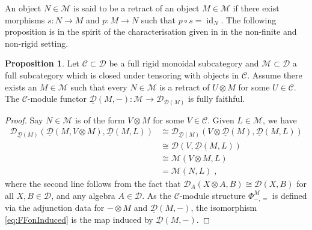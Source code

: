 \documentclass[12pt,dvipsnames]{article}
\numberwithin{equation}{section}
\theoremstyle{definition}
\newtheorem{proposition}[definition]{Proposition}
\newcommand{\cat}[1]{\mathcal{#1}}
\newcommand{\1}{\ensuremath{\mathbbm{1}}}
\DeclareMathOperator{\Id}{id}
\newcommand{\blank}{{-}}
\newcommand{\bblank}{{=}}
\begin{document}
An object $N\in\cat{M}$ is said to be a retract of an object $M\in\cat{M}$ if there exist morphisms $s:N\to M$ and $p:M\to N$ such that $p\circ s = \Id_N$. The following proposition is in the spirit of the characterisation given in \cite[Thm.\,7.10.1]{EGNO15} in the non-finite and non-rigid setting.
\begin{proposition}\label{prop:FFMCEmbedding}
    Let $\cat{C}\subset\cat{D}$ be a full rigid monoidal subcategory and $\cat{M}\subset\cat{D}$ a full subcategory which is closed under tensoring with objects in $\cat{C}$. Assume there exists an $M\in\cat{M}$ such that every $N\in\cat{M}$ is a retract of $U\otimes M$ for some $U\in\cat{C}$. The $\cat{C}$-module functor $\underline{\cat{D}}(M,\blank):\cat{M}\to\cat{D}_{\underline{\cat{D}}(M)}$ is fully faithful.
\end{proposition}
\begin{proof}
    Say $N\in\cat{M}$ is of the form $V\otimes M$ for some $V\in\cat{C}$. Given $L\in\cat{M}$, we have
    \begin{align}\label{eq:FFonInduced}
        \cat{D}_{\underline{\cat{D}}(M)}(\underline{\cat{D}}(M,V\otimes M),\underline{\cat{D}}(M,L)) &\cong \cat{D}_{\underline{\cat{D}}(M)}(V\otimes\underline{\cat{D}}(M),\underline{\cat{D}}(M,L)) \nonumber\\
        &\cong \cat{D}(V,\underline{\cat{D}}(M,L)) \nonumber\\
        &\cong \cat{M}(V\otimes M,L) \nonumber\\
        &= \cat{M}(N,L) \;,
    \end{align}
    where the second line follows from the fact that $\cat{D}_A(X\otimes A,B) \cong \cat{D}(X,B)$ for all $X,B\in\cat{D}$, and any algebra $A\in\cat{D}$. As the $\cat{C}$-module structure $\Phi^M_{\blank,\bblank}$ is defined via the adjunction data for $\blank\otimes M$ and $\underline{\cat{D}}(M,\blank)$, the isomorphism \eqref{eq:FFonInduced} is the map induced by $\underline{\cat{D}}(M,\blank)$.
    

\end{proof}
\end{document}
